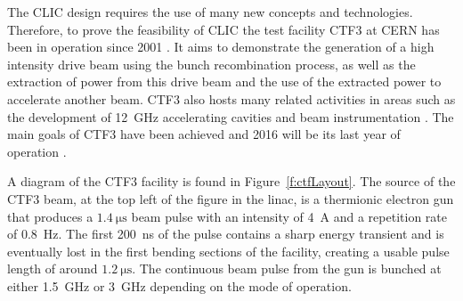 
The CLIC design requires the use of many new concepts and technologies. Therefore, to prove the feasibility of CLIC the test facility CTF3 at CERN has been in operation since 2001 \cite{CTF3}. It aims to demonstrate the generation of a high intensity drive beam using the bunch recombination process, as well as the extraction of power from this drive beam and the use of the extracted power to accelerate another beam. CTF3 also hosts many related activities in areas such as the development of 12~GHz accelerating cavities and beam instrumentation \cite{ctf2015Status}. The main goals of CTF3 have been achieved and 2016 will be its last year of operation \cite{ctf2016Plan}.




A diagram of the CTF3 facility is found in Figure~\ref{f:ctfLayout}. The source of the CTF3 beam, at the top left of the figure in the linac, is a thermionic electron gun \cite{thermionic} that produces a \(1.4~\mathrm{\mu s}\) beam pulse with an intensity of 4~A and a repetition rate of 0.8~Hz. The first 200~ns of the pulse contains a sharp energy transient and is eventually lost in the first bending sections of the facility, creating a usable pulse length of around \(1.2~\mathrm{\mu s}\). The continuous beam pulse from the gun is bunched at either 1.5~GHz or 3~GHz depending on the mode of operation.

